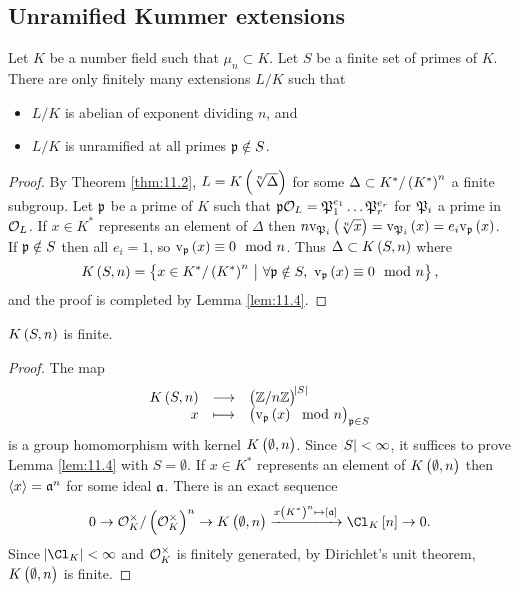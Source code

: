 \subsection{Unramified Kummer extensions}


\begin{proposition}
\label{prop:11.3}
Let $ K $ be a number field such that $ \mu_n \subset K $. Let $ S $ be a finite set of primes of $ K $. There are only finitely many extensions $ L / K $ such that
\begin{itemize}
\item $ L / K $ is abelian of exponent dividing $ n $, and
\item $ L / K $ is unramified at all primes $ \mathfrak{p} \notin S $.
\end{itemize}
\end{proposition}

\begin{proof}
By Theorem \ref{thm:11.2}, $ L = K\br{\sqrt[n]{\Delta}} $ for some $ \Delta \subset K^* / \br{K^*}^n $ a finite subgroup. Let $ \mathfrak{p} $ be a prime of $ K $ such that $ \mathfrak{p}\mathcal{O}_L = \mathfrak{P}_1^{e_1} \dots \mathfrak{P}_r^{e_r} $ for $ \mathfrak{P}_i $ a prime in $ \mathcal{O}_L $. If $ x \in K^* $ represents an element of $ \Delta $ then $ n\v_{\pp_i}\br{\sqrt[n]{x}} = \v_{\pp_i}\br{x} = e_i\v_\ppp\br{x} $. If $ \mathfrak{p} \notin S $ then all $ e_i = 1 $, so $ \v_\ppp\br{x} \equiv 0 \mod n $. Thus $ \Delta \subset K\br{S, n} $ where
$$ K\br{S, n} = \cbr{x \in K^* / \br{K^*}^n \st \forall \ppp \notin S, \ \v_\ppp\br{x} \equiv 0 \mod n}, $$
and the proof is completed by Lemma \ref{lem:11.4}.
\end{proof}

\begin{lemma}
\label{lem:11.4}
$ K\br{S, n} $ is finite.
\end{lemma}

\begin{proof}
The map
$$ \function{K\br{S, n}}{\br{\ZZ / n\ZZ}^{\abs{S}}}{x}{\br{\v_\ppp\br{x} \mod n}_{\ppp \in S}} $$
is a group homomorphism with kernel $ K\br{\emptyset, n} $. Since $ \abs{S} < \infty $, it suffices to prove Lemma \ref{lem:11.4} with $ S = \emptyset $. If $ x \in K^* $ represents an element of $ K\br{\emptyset, n} $ then $ \left\langle x \right\rangle = \mathfrak{a}^n $ for some ideal $ \mathfrak{a} $. There is an exact sequence
$$ 0 \to \OOO_K^\times / \br{\OOO_K^\times}^n \to K\br{\emptyset, n} \xrightarrow{x\br{K^*}^n \mapsto \sbr{\aaa}} \Cl_K\sbr{n} \to 0. $$
Since $ \abs{\Cl_K} < \infty $ and $ \mathcal{O}_K^\times $ is finitely generated, by Dirichlet's unit theorem, $ K\br{\emptyset, n} $ is finite.
\end{proof}

